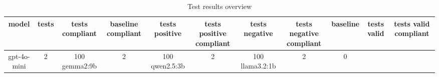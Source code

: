 
  \begin{table}[h!]
  \centering
  \begin{tabular}{|c|c|c|c|c|c|c|c|c|c|c|}
  \hline
  model & tests & tests compliant & baseline compliant & tests positive & tests positive compliant & tests negative & tests negative compliant & baseline & tests valid & tests valid compliant \\
  \hline
  gpt-4o-mini & 2 & 100%
\hline
gemma2:9b & 2 & 100%
\hline
qwen2.5:3b & 2 & 100%
\hline
llama3.2:1b & 2 & 0%
  \end{tabular}
  \caption{Test results overview}
  
  \end{table}
  